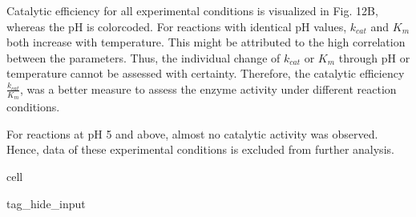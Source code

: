 \documentclass[letterpaper,12pt,english]{jupyterBook}
\begin{document}
\sphinxAtStartPar
Catalytic efficiency for all experimental conditions is visualized in Fig. 12B, whereas the pH is color\sphinxhyphen{}coded. For reactions with identical pH values, \(k_{cat}\) and \(K_{m}\) both increase with temperature. This might be attributed to the high correlation between the parameters. Thus, the individual change of \(k_{cat}\) or \(K_{m}\) through pH or temperature cannot be assessed with certainty. Therefore, the catalytic efficiency \(\frac{k_{cat}}{K_{m}}\), was a better measure to assess the enzyme activity under different reaction conditions.

\sphinxAtStartPar
For reactions at pH 5 and above, almost no catalytic activity was observed. Hence, data of these experimental conditions is excluded from further analysis.

\begin{sphinxuseclass}{cell}
\begin{sphinxuseclass}{tag_hide_input}\begin{sphinxVerbatimInput}


\end{sphinxVerbatimInput}
\end{sphinxuseclass}
\end{sphinxuseclass}
\end{document}
